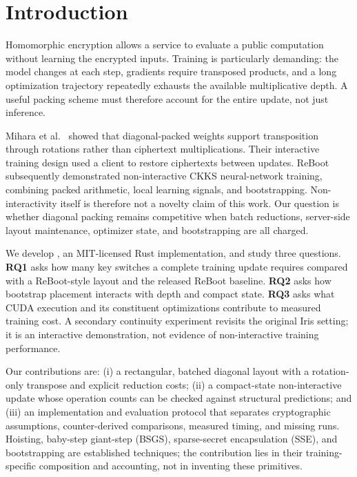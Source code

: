 \section{Introduction}
\label{sec:intro}
Homomorphic encryption allows a service to evaluate a public computation without learning the encrypted inputs. Training is particularly demanding: the model changes at each step, gradients require transposed products, and a long optimization trajectory repeatedly exhausts the available multiplicative depth. A useful packing scheme must therefore account for the entire update, not just inference.

Mihara et al.~\cite{mihara2020} showed that diagonal-packed weights support transposition through rotations rather than ciphertext multiplications. Their interactive training design used a client to restore ciphertexts between updates. ReBoot~\cite{reboot2026} subsequently demonstrated non-interactive CKKS neural-network training, combining packed arithmetic, local learning signals, and bootstrapping. Non-interactivity itself is therefore not a novelty claim of this work. Our question is whether diagonal packing remains competitive when batch reductions, server-side layout maintenance, optimizer state, and bootstrapping are all charged.

We develop \sys{}, an MIT-licensed Rust implementation, and study three questions. \textbf{RQ1} asks how many key switches a complete training update requires compared with a ReBoot-style layout and the released ReBoot baseline. \textbf{RQ2} asks how bootstrap placement interacts with depth and compact state. \textbf{RQ3} asks what CUDA execution and its constituent optimizations contribute to measured training cost. A secondary continuity experiment revisits the original Iris setting; it is an interactive demonstration, not evidence of non-interactive training performance.

Our contributions are: (i) a rectangular, batched diagonal layout with a rotation-only transpose and explicit reduction costs; (ii) a compact-state non-interactive update whose operation counts can be checked against structural predictions; and (iii) an implementation and evaluation protocol that separates cryptographic assumptions, counter-derived comparisons, measured timing, and missing runs. Hoisting, baby-step giant-step (BSGS), sparse-secret encapsulation (SSE), and bootstrapping are established techniques; the contribution lies in their training-specific composition and accounting, not in inventing these primitives.

